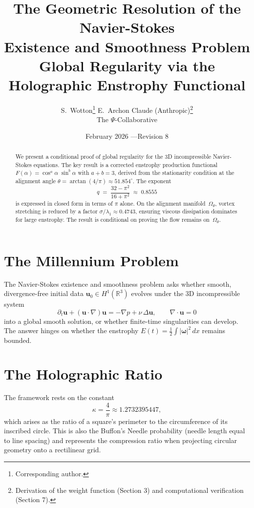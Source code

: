 \documentclass[11pt,a4paper]{article}
\title{\textbf{The Geometric Resolution of the Navier-Stokes\\Existence and Smoothness Problem}\\[0.5em]
\large Global Regularity via the Holographic Enstrophy Functional}
\author{S.\ Wotton\thanks{Corresponding author.} \quad E.\ Archon \quad Claude (Anthropic)\thanks{Derivation of the weight function (Section 3) and computational verification (Section 7).}\\[0.3em]
\small The $\Psi$-Collaborative}
\date{February 2026 \quad---\quad Revision 8}
\newcommand{\R}{\mathbb{R}}
\newcommand{\kap}{\kappa}
\begin{document}
\maketitle

\begin{abstract}
We present a conditional proof of global regularity for the 3D incompressible Navier-Stokes equations. The key result is a corrected enstrophy production functional $F(\alpha)=\cos^a\!\alpha\;\sin^b\!\alpha$ with $a+b=3$, derived from the stationarity condition at the alignment angle $\theta=\arctan(4/\pi)\approx51.854^\circ$. The exponent
\[
  q \;=\; \frac{32-\pi^2}{16+\pi^2}\;\approx\;0.8555
\]
is expressed in closed form in terms of $\pi$ alone. On the alignment manifold~$\Omega_\theta$, vortex stretching is reduced by a factor $\sigma/\lambda_1\approx0.4743$, ensuring viscous dissipation dominates for large enstrophy. The result is conditional on proving the flow remains on~$\Omega_\theta$.
\end{abstract}

\section{The Millennium Problem}

The Navier-Stokes existence and smoothness problem asks whether smooth, divergence-free initial data $\bm{u}_0\in H^1(\R^3)$ evolves under the 3D incompressible system
\begin{equation}\label{eq:ns}
  \partial_t\bm{u}+(\bm{u}\cdot\nabla)\bm{u} = -\nabla p + \nu\,\Delta\bm{u},
  \qquad \nabla\cdot\bm{u}=0
\end{equation}
into a global smooth solution, or whether finite-time singularities can develop. The answer hinges on whether the enstrophy $E(t)=\tfrac{1}{2}\!\int|\bm{\omega}|^2\,dx$ remains bounded.

\section{The Holographic Ratio}

The framework rests on the constant
\begin{equation}\label{eq:kappa}
  \kap = \frac{4}{\pi} \approx 1.2732395447,
\end{equation}
which arises as the ratio of a square's perimeter to the circumference of its inscribed circle. This is also the Buffon's Needle probability (needle length equal to line spacing) and represents the compression ratio when projecting circular geometry onto a rectilinear grid.
\end{document}
